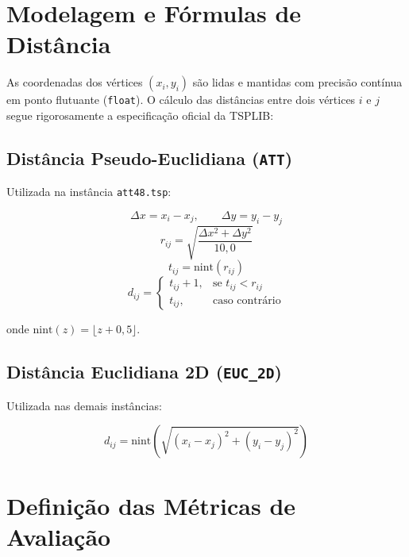 \documentclass[12pt, a4paper]{article}
\begin{document}
\section{Modelagem e Fórmulas de Distância}

As coordenadas dos vértices $(x_i, y_i)$ são lidas e mantidas com precisão contínua em
ponto flutuante (\texttt{float}). O cálculo das distâncias entre dois vértices $i$ e $j$
segue rigorosamente a especificação oficial da TSPLIB:

\subsection{Distância Pseudo-Euclidiana (\texttt{ATT})}

Utilizada na instância \texttt{att48.tsp}:

\begin{equation}
    \Delta x = x_i - x_j, \qquad \Delta y = y_i - y_j
\end{equation}
\begin{equation}
    r_{ij} = \sqrt{\frac{\Delta x^2 + \Delta y^2}{10{,}0}}
\end{equation}
\begin{equation}
    t_{ij} = \mathrm{nint}(r_{ij})
\end{equation}
\begin{equation}
    d_{ij} =
    \begin{cases}
        t_{ij} + 1, & \text{se } t_{ij} < r_{ij} \\
        t_{ij},     & \text{caso contrário}
    \end{cases}
\end{equation}

\noindent onde $\mathrm{nint}(z) = \lfloor z + 0{,}5 \rfloor$.

\subsection{Distância Euclidiana 2D (\texttt{EUC\_2D})}

Utilizada nas demais instâncias:

\begin{equation}
    d_{ij} = \mathrm{nint}\!\left(\sqrt{(x_i - x_j)^2 + (y_i - y_j)^2}\right)
\end{equation}

\section{Definição das Métricas de Avaliação}
\end{document}
